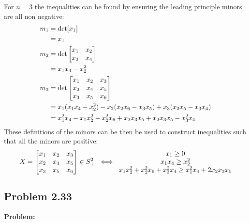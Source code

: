 \documentclass[letter]{article}
\begin{document}
For $n=3$ the inequalities can be found by ensuring the leading principle minors are all non negative:
\begin{equation}
	\begin{aligned}
		m_1 &= \det[x_1]\\
		&= x_1\\
		m_2 &= \det \mqty[x_1 & x_2 \\ x_2 & x_4] \\
		&= x_1 x_4 - x_2^2\\
		m_3 &= \det \mqty[x_1 & x_2 & x_3\\ x_2 & x_4 & x_5\\ x_3 & x_5 & x_6] \\
		&= x_1 (x_1 x_4 - x_2^2) - x_2 (x_2 x_6 - x_3 x_5) + x_3 (x_2 x_5 - x_3 x_4)\\
		&= x_1^2 x_4 - x_1 x_2^2 - x_2^2 x_6 + x_2 x_3 x_5 + x_2 x_3 x_5 - x_3^2 x_4
	\end{aligned}
\end{equation}
These definitions of the minors can be then be used to construct inequalities such that all the minors are positive:
\begin{equation}
	X = \mqty[x_1 & x_2 & x_3\\ x_2 & x_4 & x_5\\ x_3 & x_5 & x_6] \in S_+^2 \ \iff \ 
	\mqty{x_1 \geq 0\\
			x_1 x_4 \geq x_2^2\\
		 x_1 x_2^2 + x_2^2 x_6 + x_3^2 x_4 \geq x_1^2 x_4 + 2 x_2 x_3 x_5}
\end{equation}




\subsection{Problem 2.33}
\textbf{Problem:}\\
\end{document}
